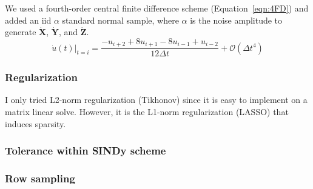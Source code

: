 \documentclass{article}
\newcommand{\bb}[1]{\mathbf{#1}}
\theoremstyle{definition}
\begin{document}
We used a fourth-order central finite difference scheme (Equation~\ref{eqn:4FD}) and added an iid $\alpha$ standard normal sample, where $\alpha$ is the noise amplitude to generate $\dot{\bb{X}}$, $\dot{\bb{Y}}$, and $\dot{\bb{Z}}$.
\begin{equation}
	\dot{u}(t)|_{t=i} = \frac{-u_{i+2}+8u_{i+1}-8u_{i-1}+u_{i-2}}{12\Delta t} + \mathcal{O}(\Delta t^4) \label{eqn:4FD}
\end{equation}


\subsubsection{Regularization}
I only tried L2-norm regularization (Tikhonov) since it is easy to implement on a matrix linear solve. 
However, it is the L1-norm regularization (LASSO) that induces sparsity. 

\subsubsection{Tolerance within SINDy scheme}

\subsubsection{Row sampling}








\end{document}
